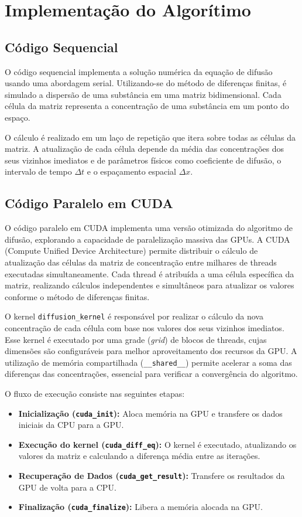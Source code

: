 \documentclass[12pt]{article}
\begin{document}
\section{Implementação do Algorítimo}

\subsection{Código Sequencial}

O código sequencial implementa a solução numérica da equação de difusão usando
uma abordagem serial. Utilizando-se do método de diferenças finitas, é simulado
a dispersão de uma substância em uma matriz bidimensional. Cada célula da
matriz representa a concentração de uma substância em um ponto do espaço.

O cálculo é realizado em um laço de repetição que itera sobre todas as células
da matriz. A atualização de cada célula depende da média das concentrações dos
seus vizinhos imediatos e de parâmetros físicos como coeficiente de difusão, o
intervalo de tempo $\Delta t$ e o espaçamento espacial $\Delta x$.

\subsection{Código Paralelo em CUDA}

O código paralelo em CUDA implementa uma versão otimizada do algoritmo de
difusão, explorando a capacidade de paralelização massiva das GPUs. A CUDA
(Compute Unified Device Architecture) permite distribuir o cálculo de
atualização das células da matriz de concentração entre milhares de threads
executadas simultaneamente. Cada thread é atribuída a uma célula específica da
matriz, realizando cálculos independentes e simultâneos para atualizar os
valores conforme o método de diferenças finitas.

O kernel \texttt{diffusion\_kernel} é responsável por realizar o cálculo da
nova concentração de cada célula com base nos valores dos seus vizinhos
imediatos. Esse kernel é executado por uma grade (\textit{grid}) de blocos de
threads, cujas dimensões são configuráveis para melhor aproveitamento dos
recursos da GPU. A utilização de memória compartilhada
(\texttt{\_\_shared\_\_}) permite acelerar a soma das diferenças das
concentrações, essencial para verificar a convergência do algoritmo.

O fluxo de execução consiste nas seguintes etapas:

\begin{itemize}
  \item \textbf{Inicialização (\texttt{cuda\_init}):} Aloca memória na GPU e transfere os dados iniciais da CPU para a GPU.
  \item \textbf{Execução do kernel (\texttt{cuda\_diff\_eq}):} O kernel é executado, atualizando os valores da matriz e calculando a diferença média entre as iterações.
  \item \textbf{Recuperação de Dados (\texttt{cuda\_get\_result}):} Transfere os resultados da GPU de volta para a CPU.
  \item \textbf{Finalização (\texttt{cuda\_finalize}):} Libera a memória alocada na GPU.
\end{itemize}
\end{document}
